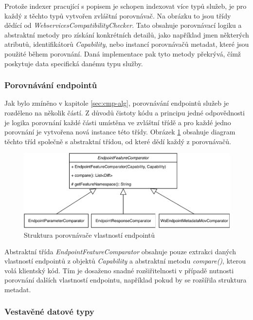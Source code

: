 \documentclass[czech,DP]{thesiskiv}
\begin{document}
Protože indexer pracující s popisem je schopen indexovat více typů služeb, je pro každý z těchto typů vytvořen zvláštní porovnávač. Na obrázku to jsou třídy dědící od \textit{WebservicesCompatibilityChecker}. Tato obsahuje porovnávací logiku a abstraktní metody pro získání konkrétních detailů, jako například jmen některých atributů, identifikátorů \textit{Capability}, nebo instancí porovnávačů metadat, které jsou použité během porovnání. Daná implementace pak tyto metody překrývá, čímž poskytuje data specifická danému typu služby.

\subsubsection{Porovnávání endpointů}

Jak bylo zmíněno v kapitole \ref{sec:cmp-alg}, porovnávání endpointů služeb je rozděleno na několik částí. Z důvodů čistoty kódu a principu jedné odpovědnosti je logika porovnání každé části umístěna ve zvláštní třídě a pro každé jedno porovnání je vytvořena nová instance této třídy. Obrázek \ref{fig:endpoint-cmp-uml-class} obsahuje diagram těchto tříd společně s abstraktní třídou, od které dědí každý z porovnávačů. 

\begin{figure}[h]
	\centering
	\includegraphics[width=\linewidth]{endpoint-cmp-uml-class}
	\caption{Struktura porovnávače vlastností endpointů}
	\label{fig:endpoint-cmp-uml-class}
\end{figure}

Abstraktní třída \textit{EndpointFeatureComparator} obsahuje pouze extrakci daných vlastností endpointů z objektů \textit{Capability} a abstraktní metodu \textit{compare()}, kterou volá klientský kód. Tím je dosaženo snadné rozšiřitelnosti v případě nutnosti porovnání dalších vlastností endpointu, například pokud by se rozšířila struktura metadat. 

\subsubsection{Vestavěné datové typy}
\end{document}
